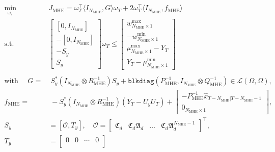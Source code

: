 \begin{equation} \label{eq:3_MHE_QP}
    \begin{aligned}
        \min_{\omega_T} \quad & J_{\mathrm{MHE}} = \omega_T^\top \langle I_{N_{\mathrm{MHE}}}, G \rangle \omega_T + 2 \omega_T^\top \langle I_{N_{\mathrm{MHE}}}, f_{\mathrm{MHE}} \rangle \\
        \text{s.t.} \quad &
        \begin{bmatrix}
        [0 , I_{N_{\mathrm{MHE}}}] \\
        -[0 , I_{N_{\mathrm{MHE}}}] \\
        -S_y \\
        S_y
        \end{bmatrix}
        \omega_T
        \leq
        \begin{bmatrix}
        w^{\max}_{{N_{\mathrm{MHE}}} \times 1} \\
        -w^{\min}_{{N_{\mathrm{MHE}}} \times 1} \\
        {\mu}^{\max}_{{N_{\mathrm{MHE}}} \times 1} - Y_T \\
        Y_T - {\mu}^{\min}_{{N_{\mathrm{MHE}}} \times 1}
        \end{bmatrix} \\
        \\
        \text{with } \quad
        G = &\; S_y^\ast (I_{N_{\mathrm{MHE}}} \otimes R_{\mathrm{MHE}}^{-1}) S_y + \texttt{blkdiag}(P_{\mathrm{MHE}}^{-1}, I_{N_{\mathrm{MHE}}} \otimes Q_{\mathrm{MHE}}^{-1}) \in \mathcal{L}(\Omega,\Omega), \\[1ex]
        f_{\mathrm{MHE}} = &\; -S_y^\ast (I_{N_{\mathrm{MHE}}} \otimes R_{\mathrm{MHE}}^{-1}) (Y_T - U_y U_T) + 
        \begin{bmatrix}
        -P_{\mathrm{MHE}}^{-1} \hat{x}_{T-{N_{\mathrm{MHE}}}|T-{N_{\mathrm{MHE}}}-1} \\
        0_{{N_{\mathrm{MHE}}} \times 1}
        \end{bmatrix}, \\[1ex]
        S_y &= [\mathcal{O}, T_y], \quad
        \mathcal{O} = 
        \begin{bmatrix}
        \mathfrak{C}_d &
        \mathfrak{C}_d \mathfrak{A}_d &
        \hdots &
        \mathfrak{C}_d \mathfrak{A}_d^{{N_{\mathrm{MHE}}}-1}
        \end{bmatrix}^\top, \\[1ex]
        T_y &=
        \begin{bmatrix}
        0 & 0 & \cdots & 0 \\

\end{bmatrix}
\end{aligned}
\end{equation}
